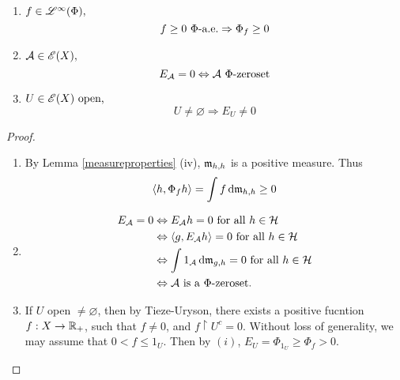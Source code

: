 \begin{lem}
  \leavevmode
  \label{maintheorem3+}
 \begin{enumerate}
  \item $f \in \mathscr{L}^\infty (\Phi),$ 
  \[
   f \geq 0 ~\Phi\text{-a.e.} \Rightarrow \Phi_f \geq 0
  \]

  \item $\mathcal{A} \in \mathscr{E}(X),$
  \[
  E_\mathcal{A} =0  \Leftrightarrow \mathcal{A} ~\Phi\text{-zeroset}
  \]
  \item $U \in \mathscr{E}(X)\text{ open,}$ 
  \[
   U \neq \varnothing \Rightarrow E_U \neq 0
  \]

 \end{enumerate}

\end{lem}


\begin{proof}
  \leavevmode
 \begin{enumerate}
   \item By Lemma \ref{measureproperties} (iv), $\mathfrak{m}_{h,h}$ is a positive
   measure. Thus 
   \[
      \left\langle h, \Phi_f h  \right\rangle = \int f \operatorname{d}\! \mathfrak{m}_{h,h} \geq 0
   \]

   \item   \begin{align*}
     E_\mathcal{A} =0 & \Leftrightarrow E_\mathcal{A} h =0 \text{ for all } h \in \mathcal{H} \\
     &\Leftrightarrow \left\langle g, E_\mathcal{A} h  \right\rangle =0 \text{ for all } h \in \mathcal{H} \\
     &\Leftrightarrow \int 1_\mathcal{A} \operatorname{d}\! \mathfrak{m}_{g,h} =0 \text{ for all } h \in \mathcal{H} \\
     &\Leftrightarrow \mathcal{A} \text{ is a } \Phi\text{-zeroset}.
   \end{align*}
   \item 
   If $U$ open $\neq \varnothing$, then by Tieze-Uryson, there exists a
   positive fucntion $f : X \to \mathbb{R}_+$, such that $f\neq 0$, and 
   $f\restriction U^c = 0$. Without loss of generality, we may assume 
   that $0< f \leq 1_{U}$. Then by $(i)$, $E_{U}= \Phi_{1_{U}} \geq \Phi_f > 0$.
 \end{enumerate}

\end{proof}

